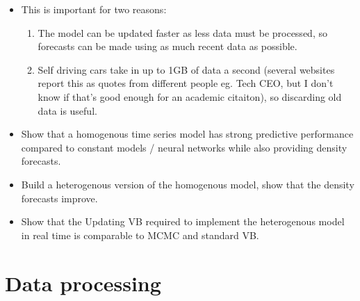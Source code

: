 \documentclass[12pt,a4paper]{article}\usepackage[]{graphicx}\usepackage[]{color}
\begin{document}
\begin{itemize}
\item This is important for two reasons:
\begin{enumerate}
\item The model can be updated faster as less data must be processed, so forecasts can be made using as much recent data as possible.
\item Self driving cars take in up to 1GB of data a second (several websites report this as quotes from different people eg. Tech CEO, but I don't know if that's good enough for an academic citaiton), so discarding old data is useful.
\end{enumerate}
\item Show that a homogenous time series model has strong predictive performance compared to constant models / neural networks while also providing density forecasts.
\item Build a heterogenous version of the homogenous model, show that the density forecasts improve. 
\item Show that the Updating VB required to implement the heterogenous model in real time is comparable to MCMC and standard VB.
\end{itemize}

\section{Data processing}
\end{document}
